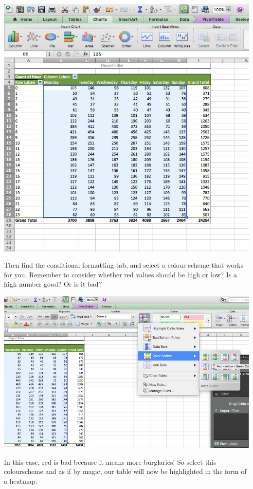 \documentclass[
]{book}
\begin{document}
\includegraphics{imgs/cond_1.png}

Then find the conditional formatting tab, and select a colour scheme that works for you. Remember to consider whether red values should be high or low? Is a high number good? Or is it bad?

\includegraphics{imgs/cond_2.png}

In this case, red is bad because it means more burglaries! So select this colourscheme and as if by magic, our table will now be highlighted in the form of a heatmap:
\end{document}
